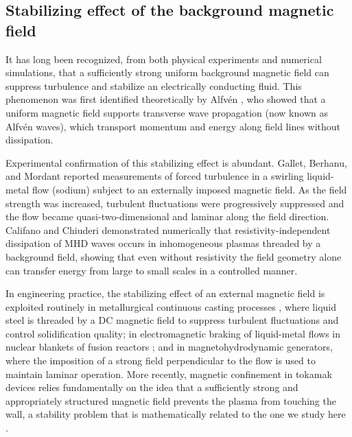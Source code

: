 \documentclass[12pt, reqno]{amsart}
\numberwithin{equation}{section}
\numberwithin{equation}{section}
\numberwithin{equation}{section}
\numberwithin{equation}{section}
\theoremstyle{remark}
\begin{document}
\subsection{Stabilizing effect of the background magnetic field}
It has long been recognized, from both physical experiments and numerical
simulations, that a sufficiently strong uniform background magnetic
	field can suppress turbulence and stabilize an electrically conducting
fluid.  This phenomenon was first identified theoretically by
Alfv\'{e}n \cite{ALF}, who showed that a uniform magnetic field supports
transverse wave propagation (now known as Alfv\'en waves), which
transport momentum and energy along field lines without dissipation.

\medskip
Experimental confirmation of this stabilizing effect is abundant.
Gallet, Berhanu, and Mordant \cite{GBM} reported measurements of forced
turbulence in a swirling liquid-metal flow (sodium) subject to an
externally imposed magnetic field. As the field strength was increased,
turbulent fluctuations were progressively suppressed and the flow
became quasi-two-dimensional and laminar along the field direction.
Califano and Chiuderi \cite{CC} demonstrated numerically that resistivity-independent dissipation of MHD waves occurs in inhomogeneous plasmas threaded by a background field, showing that even without resistivity the field geometry alone can transfer energy from large to small scales in a controlled manner.

\medskip
In engineering practice, the stabilizing effect of an external magnetic
field is exploited routinely in metallurgical continuous casting
processes \cite{Davidson}, where liquid steel is threaded by a DC
magnetic field to suppress turbulent fluctuations and control
solidification quality; in electromagnetic braking of liquid-metal
flows in nuclear blankets of fusion reactors \cite{Moreau}; and in
magnetohydrodynamic generators, where the imposition of a strong field
perpendicular to the flow is used to maintain laminar operation.
More recently, magnetic confinement in tokamak devices relies
fundamentally on the idea that a sufficiently strong and appropriately
structured magnetic field prevents the plasma from touching the wall,
a stability problem that is mathematically related to the one we study
here \cite{Cabannes-H,Landau-Lifshitz}.
\end{document}
